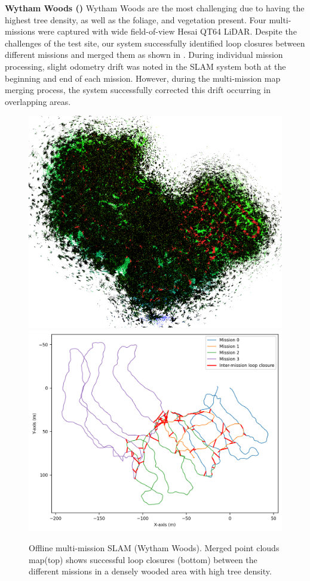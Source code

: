 \noindent \textbf{Wytham Woods ()} \hspace{0.5em}  Wytham Woods are the most challenging due to having the highest tree density, as well as the foliage, and vegetation present. Four multi-missions were captured with wide field-of-view Hesai QT64 LiDAR. Despite the challenges of the test site, our system successfully identified loop closures between different missions and merged them as shown in . During individual mission processing, slight odometry drift was noted in the SLAM system both at the beginning and end of each mission. However, during the multi-mission map merging process, the system successfully corrected this drift occurring in overlapping areas. 
\begin{figure}[htbp]
  \centering
  \includegraphics[width=0.9\columnwidth]{pics/exp_3_offline_wytham_pcd.png}
  \includegraphics[width=0.9\columnwidth]{pics/exp_3_1_multimission_slam_wytham_ratio.png}
  \caption{Offline multi-mission SLAM (Wytham Woods). Merged point clouds map(top) shows successful loop closures (bottom) between the different missions in a densely wooded area with high tree density.}
  \label{fig:exp_multi_mission_wytham}
\end{figure}
\vspace{5pt}

